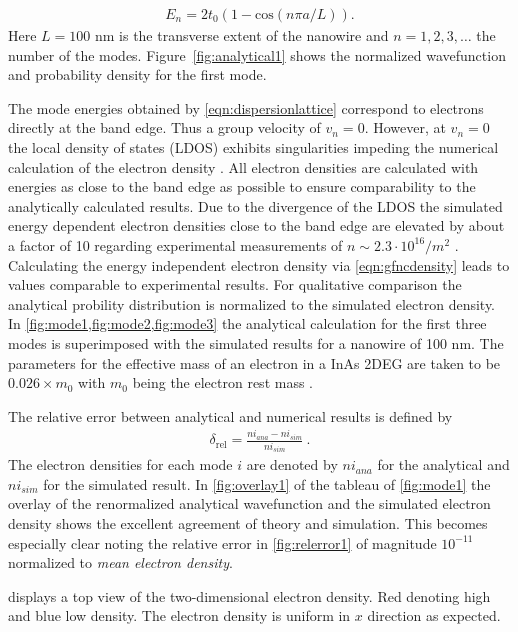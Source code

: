 \begin{align}
E_{n} = 2t_0(1-\text{cos}(n\pi a/L)).
\label{eqn:dispersionlattice}
\end{align}
Here $L=100$ nm is the transverse extent of the nanowire and $n=1,2,3,\dotsc$ the number of the modes. Figure~\ref{fig:analytical1} shows the normalized wavefunction and probability density for the first mode.\par
The mode energies obtained by \cref{eqn:dispersionlattice} correspond to electrons directly at the band edge. Thus a group velocity of $v_n=0$. However, at $v_n=0$ the local density of states (LDOS) exhibits singularities \cite{ghasemi:69010R} impeding the numerical calculation of the electron density \cite{Wimmer2009Thesis}.
All electron densities are calculated with energies as close to the band edge as possible to ensure comparability to the analytically calculated results. Due to the divergence of the LDOS the simulated energy dependent electron densities close to the band edge are elevated by about a factor of 10 regarding experimental measurements of $n \sim2.3\cdot 10^{16}/m^2$ \cite{gelfand2006} \cite{JJAP.26.L59}. Calculating the energy independent electron density via \cref{eqn:gfncdensity} leads to values comparable to experimental results. For qualitative comparison the analytical probility distribution is normalized to the simulated electron density.
In \cref{fig:mode1,fig:mode2,fig:mode3} the analytical calculation for the first three modes is superimposed with the simulated results for a nanowire of 100 nm. 
The parameters for the effective mass of an electron in a InAs 2DEG are taken to be $0.026\times m_0$ with $m_0$ being the electron rest mass \cite{PhysRev.105.460}.\par
The relative error between analytical and numerical results is defined by
\begin{align}
\delta_{\text{rel}} = \frac{ni_{ana}-ni_{sim}}{ni_{sim}}\ .
\end{align}
The electron densities for each mode $i$ are denoted by $ni_{ana}$ for the analytical and $ni_{sim}$ for the simulated result.
In \cref{fig:overlay1} of the tableau of \cref{fig:mode1} the overlay of the renormalized analytical wavefunction and the simulated electron density shows the excellent agreement of theory and simulation. This becomes especially clear noting the relative error in \cref{fig:relerror1} of magnitude $10^{-11}$ normalized to \emph{mean electron density}.\par
{} displays a top view of the two-dimensional electron density. Red denoting high and blue low density. The electron density is uniform in $x$ direction as expected.\par
